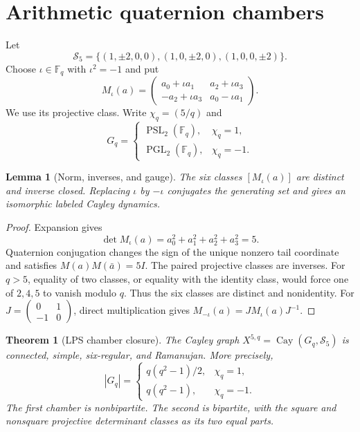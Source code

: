 \documentclass[10pt]{article}
\newtheorem{theorem}{Theorem}
\newtheorem{lemma}{Lemma}
\newcommand{\Fq}{\mathbb F_q}
\newcommand{\PSL}{\operatorname{PSL}}
\newcommand{\PGL}{\operatorname{PGL}}
\begin{document}
\section{Arithmetic quaternion chambers}
Let
\[
 \mathcal S_5=\{(1,\pm2,0,0),(1,0,\pm2,0),(1,0,0,\pm2)\}.
\]
Choose $\iota\in\Fq$ with $\iota^2=-1$ and put
\begin{equation}\label{eq:matrix}
 M_\iota(a)=
 \begin{pmatrix}
 a_0+\iota a_1&a_2+\iota a_3\\
 -a_2+\iota a_3&a_0-\iota a_1
 \end{pmatrix}.
\end{equation}
We use its projective class. Write $\chi_q=(5/q)$ and
\[
 G_q=\begin{cases}
 \PSL_2(\Fq),&\chi_q=1,\\
 \PGL_2(\Fq),&\chi_q=-1.
 \end{cases}
\]

\begin{lemma}[Norm, inverses, and gauge]\label{lem:gauge}
The six classes $[M_\iota(a)]$ are distinct and inverse closed. Replacing
$\iota$ by $-\iota$ conjugates the generating set and gives an isomorphic
labeled Cayley dynamics.
\end{lemma}

\begin{proof}
Expansion gives
\[
 \det M_\iota(a)=a_0^2+a_1^2+a_2^2+a_3^2=5.
\]
Quaternion conjugation changes the sign of the unique nonzero tail
coordinate and satisfies $M(a)M(\bar a)=5I$. The paired projective classes
are inverses. For $q>5$, equality of two classes, or equality with the
identity class, would force one of $2,4,5$ to vanish modulo $q$. Thus the
six classes are distinct and nonidentity. For
$J=\left(\begin{smallmatrix}0&1\\-1&0\end{smallmatrix}\right)$, direct
multiplication gives $M_{-\iota}(a)=JM_\iota(a)J^{-1}$.
\end{proof}

\begin{theorem}[LPS chamber closure]\label{thm:chamber}
The Cayley graph $X^{5,q}=\operatorname{Cay}(G_q,\mathcal S_5)$ is connected,
simple, six-regular, and Ramanujan. More precisely,
\[
 |G_q|=\begin{cases}
 q(q^2-1)/2,&\chi_q=1,\\
 q(q^2-1),&\chi_q=-1.
 \end{cases}
\]
The first chamber is nonbipartite. The second is bipartite, with the square
and nonsquare projective determinant classes as its two equal parts.
\end{theorem}
\end{document}
